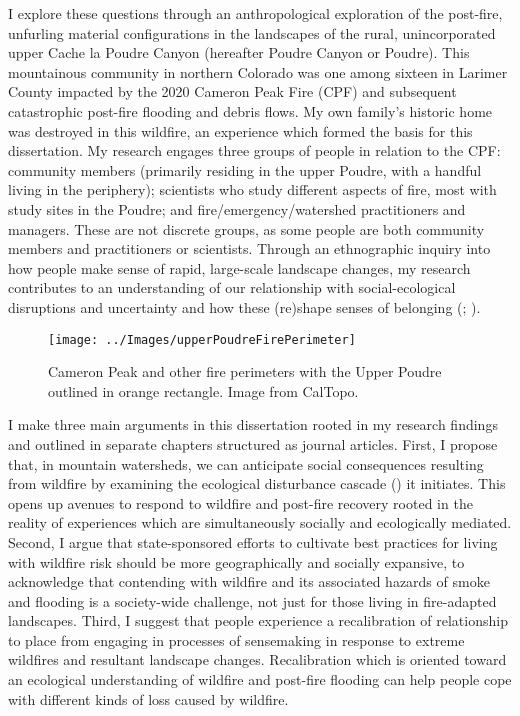 \documentclass[
]{article}
\begin{document}
I explore these questions through an anthropological exploration of the post-fire, unfurling material configurations in the landscapes of the rural, unincorporated upper Cache la Poudre Canyon (hereafter Poudre Canyon or Poudre). This mountainous community in northern Colorado was one among sixteen in Larimer County impacted by the 2020 Cameron Peak Fire (CPF) and subsequent catastrophic post-fire flooding and debris flows. My own family's historic home was destroyed in this wildfire, an experience which formed the basis for this dissertation. My research engages three groups of people in relation to the CPF: community members (primarily residing in the upper Poudre, with a handful living in the periphery); scientists who study different aspects of fire, most with study sites in the Poudre; and fire/emergency/watershed practitioners and managers. These are not discrete groups, as some people are both community members and practitioners or scientists. Through an ethnographic inquiry into how people make sense of rapid, large-scale landscape changes, my research contributes to an understanding of our relationship with social-ecological disruptions and uncertainty and how these (re)shape senses of belonging (; ).

\begin{figure}
\texttt{[image: ../Images/upperPoudreFirePerimeter]} \caption[CPF Perimeter]{Cameron Peak and other fire perimeters with the Upper Poudre outlined in orange rectangle. Image from CalTopo.}\label{fig:figureTitle}
\end{figure}

I make three main arguments in this dissertation rooted in my research findings and outlined in separate chapters structured as journal articles. First, I propose that, in mountain watersheds, we can anticipate social consequences resulting from wildfire by examining the ecological disturbance cascade () it initiates. This opens up avenues to respond to wildfire and post-fire recovery rooted in the reality of experiences which are simultaneously socially and ecologically mediated. Second, I argue that state-sponsored efforts to cultivate best practices for living with wildfire risk should be more geographically and socially expansive, to acknowledge that contending with wildfire and its associated hazards of smoke and flooding is a society-wide challenge, not just for those living in fire-adapted landscapes. Third, I suggest that people experience a recalibration of relationship to place from engaging in processes of sensemaking in response to extreme wildfires and resultant landscape changes. Recalibration which is oriented toward an ecological understanding of wildfire and post-fire flooding can help people cope with different kinds of loss caused by wildfire.
\end{document}
